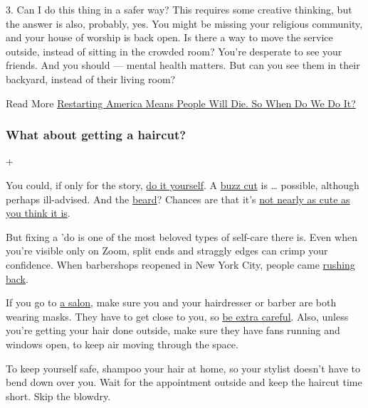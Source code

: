 3. Can I do this thing in a safer way? This requires some creative
thinking, but the answer is also, probably, yes. You might be missing
your religious community, and your house of worship is back open. Is
there a way to move the service outside, instead of sitting in the
crowded room? You're desperate to see your friends. And you should ---
mental health matters. But can you see them in their backyard, instead
of their living room?

Read More
\href{https://www.nytimes3xbfgragh.onion/2020/04/10/magazine/coronavirus-economy-debate.html}{Restarting
America Means People Will Die. So When Do We Do It?}

\hypertarget{what-about-getting-a-haircut}{%
\subsubsection{What about getting a
haircut?}\label{what-about-getting-a-haircut}}

+

You could, if only for the story,
\href{https://www.nytimes3xbfgragh.onion/wirecutter/reviews/how-to-cut-your-own-hair/}{do
it yourself}. A
\href{https://www.nytimes3xbfgragh.onion/2020/04/15/style/self-care/buzz-cut-your-own-hair.html}{buzz
cut} is \ldots{} possible, although perhaps ill-advised. And the
\href{https://www.nytimes3xbfgragh.onion/2020/04/21/smarter-living/maybe-consider-shaving-that-pandemic-beard.html}{beard}?
Chances are that it's
\href{https://www.nytimes3xbfgragh.onion/2020/07/03/at-home/coronavirus-beards.html}{not
nearly as cute as you think it is}.

But fixing a 'do is one of the most beloved types of self-care there is.
Even when you're visible only on Zoom, split ends and straggly edges can
crimp your confidence. When barbershops reopened in New York City,
people came
\href{https://www.nytimes3xbfgragh.onion/2020/06/25/nyregion/nyc-barber-shops-coronavirus.html}{rushing
back}.

If you go to
\href{https://www.nytimes3xbfgragh.onion/2020/06/12/fashion/haircut-salon-reopening.html}{a
salon}, make sure you and your hairdresser or barber are both wearing
masks. They have to get close to you, so
\href{https://www.nytimes3xbfgragh.onion/2020/05/06/style/coronavirus-haircuts-barbers.html}{be
extra careful}. Also, unless you're getting your hair done outside, make
sure they have fans running and windows open, to keep air moving through
the space.

To keep yourself safe, shampoo your hair at home, so your stylist
doesn't have to bend down over you. Wait for the appointment outside and
keep the haircut time short. Skip the blowdry.

